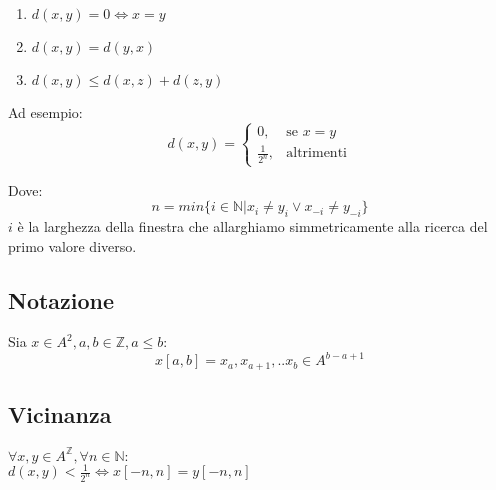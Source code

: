 \begin{enumerate}
	\item $d(x,y) = 0 \Leftrightarrow x = y$
	\item $d(x,y) = d(y,x) $
	\item $d(x,y) \leq d(x,z) + d(z,y)$
\end{enumerate}
	
Ad esempio:
\begin{equation}    
	d(x,y)= 
	\begin{cases}
	0,& \text{se } x=y\\
	\frac{1}{2^n},              & \text{altrimenti}
	\end{cases}
\end{equation}
	
Dove:
$$n = min\{ i \in \mathds{N} | x_i \neq y_i \vee x_{-i} \neq y_{-i} \} $$ $i$ 
è la larghezza della finestra che allarghiamo simmetricamente alla ricerca del primo valore diverso.
	
\subsection{Notazione} 
Sia $x \in A^2, a,b \in \mathds{Z}, a \leq b$:
$$x[a,b] = x_a, x_{a+1}, .. x_{b} \in A^{b-a+1}$$
	
	
\subsection{Vicinanza}
$\forall x,y \in A^\mathds{Z}, \forall n \in \mathds{N}:$ \\
$d(x,y) < \frac{1}{2^n} \iff x[-n,n] = y[-n,n]$
	



